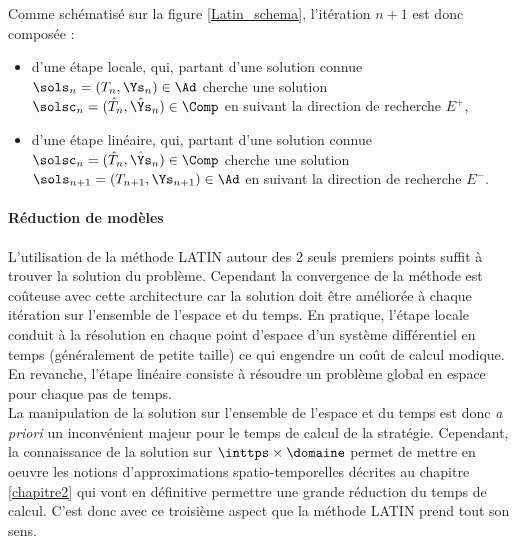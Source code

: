 Comme schématisé sur la figure \ref{Latin_schema}, l'itération $n+1$ est donc composée :\\
\begin{itemize}
\item d'une étape locale, qui, partant d'une solution connue $\sols_{n} = (T_{n}, \Ys_{n}) \in \Ad$ cherche une solution $\solsc_{n} = (\hat{T}_{n}, \hat{\Ys}_{n}) \in \Comp$ en suivant la direction de recherche $E^+$, \\ 
\item d'une étape linéaire, qui, partant d'une solution connue $\solsc_{n} = (\hat{T}_{n}, \hat{\Ys}_{n}) \in \Comp$ cherche une solution $\sols_{n+1} = (T_{n+1}, \Ys_{n+1}) \in \Ad$ en suivant la direction de recherche $E^-$.\\
\end{itemize}



    \paragraph{Réduction de modèles }


L'utilisation de la méthode LATIN autour des 2 seuls premiers points suffit à trouver la solution du problème. Cependant la convergence de la méthode est coûteuse avec cette architecture car la solution doit être améliorée à chaque itération sur l'ensemble de l'espace et du temps. En pratique, l'étape locale conduit à la résolution en chaque point d'espace d'un système différentiel en temps (généralement de petite taille) ce qui engendre un coût de calcul modique. En revanche, l'étape linéaire consiste à résoudre un problème global en espace pour chaque pas de temps.\\
La manipulation de la solution sur l'ensemble de l'espace et du temps est donc \textit{a priori} un inconvénient majeur pour le temps de calcul de la stratégie. Cependant, la connaissance de la solution sur $\inttps \times \domaine$ permet de mettre en oeuvre les notions d'approximations spatio-temporelles décrites au chapitre \ref{chapitre2} qui vont en définitive permettre une grande réduction du temps de calcul. C'est donc avec ce troisième aspect que la méthode LATIN prend tout son sens.\\

